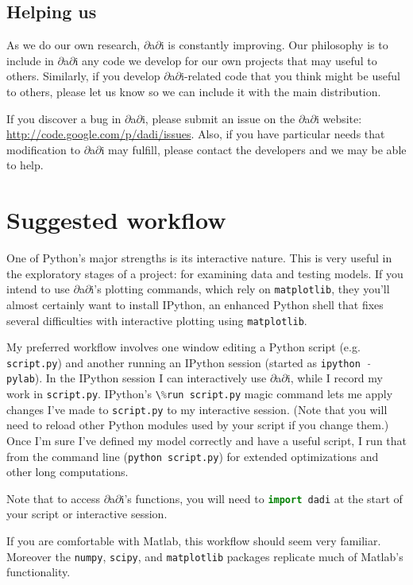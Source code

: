 \documentclass[12pt]{article}
\makeatletter
\newcommand{\dadi}{$\partial$a$\partial$i\xspace}
\newcommand{\py}[1]{\lstinline[language=Python, showstringspaces=False]@#1@}
\makeatother
\begin{document}
\subsection{Helping us}

As we do our own research, \dadi is constantly improving.
Our philosophy is to include in \dadi any code we develop for our own projects that may useful to others.
Similarly, if you develop \dadi-related code that you think might be useful to others, please let us know so we can include it with the main distribution.

If you discover a bug in \dadi, please submit an issue on the \dadi website: \url{http://code.google.com/p/dadi/issues}.
Also, if you have particular needs that modification to \dadi may fulfill, please contact the developers and we may be able to help.

\section{Suggested workflow}

One of Python's major strengths is its interactive nature.
This is very useful in the exploratory stages of a project: for examining data and testing models.
If you intend to use \dadi's plotting commands, which rely on \py{matplotlib}, they you'll almost certainly want to install IPython, an enhanced Python shell that fixes several difficulties with interactive plotting using \py{matplotlib}.

My preferred workflow involves one window editing a Python script (e.g. \py{script.py}) and another running an IPython session (started as \py{ipython -pylab}).
In the IPython session I can interactively use \dadi, while I record my work in \py{script.py}.
IPython's \py{\%run script.py} magic command lets me apply changes I've made to \py{script.py} to my interactive session. 
(Note that you will need to reload other Python modules used by your script if you change them.)
Once I'm sure I've defined my model correctly and have a useful script, I run that from the command line (\py{python script.py}) for extended optimizations and other long computations.

Note that to access \dadi's functions, you will need to \py{import dadi} at the start of your script or interactive session.

If you are comfortable with Matlab, this workflow should seem very familiar.
Moreover the \py{numpy}, \py{scipy}, and \py{matplotlib} packages replicate much of Matlab's functionality.
\end{document}
